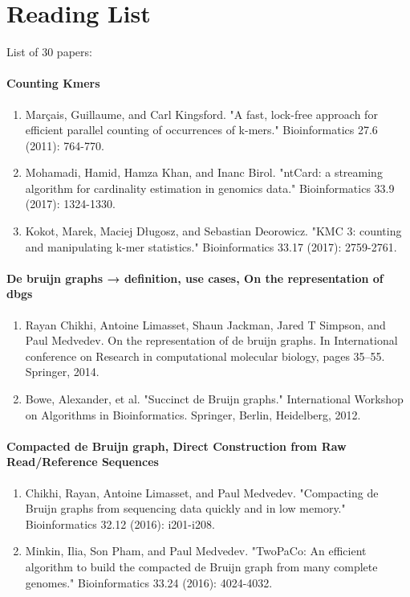 
\chapter{Reading List}
\label{chap:readingList}

List of 30 papers:
\subsubsection{Counting Kmers}
\begin{enumerate}
    \item Marçais, Guillaume, and Carl Kingsford. "A fast, lock-free approach for efficient parallel counting of occurrences of k-mers." Bioinformatics 27.6 (2011): 764-770.
    \item Mohamadi, Hamid, Hamza Khan, and Inanc Birol. "ntCard: a streaming algorithm for cardinality estimation in genomics data." Bioinformatics 33.9 (2017): 1324-1330.
    \item Kokot, Marek, Maciej Długosz, and Sebastian Deorowicz. "KMC 3: counting and manipulating k-mer statistics." Bioinformatics 33.17 (2017): 2759-2761.
\end{enumerate}
\subsubsection{De bruijn graphs → definition, use cases, On the representation of dbgs}
\begin{enumerate}
    \item Rayan Chikhi, Antoine Limasset, Shaun Jackman, Jared T Simpson, and Paul Medvedev. On the representation of de bruijn graphs. In International conference on Research in computational molecular biology, pages 35–55. Springer, 2014.
    \item Bowe, Alexander, et al. "Succinct de Bruijn graphs." International Workshop on Algorithms in Bioinformatics. Springer, Berlin, Heidelberg, 2012.
\end{enumerate}
\subsubsection{Compacted de Bruijn graph, Direct Construction from Raw Read/Reference Sequences}
\begin{enumerate}
    \item Chikhi, Rayan, Antoine Limasset, and Paul Medvedev. "Compacting de Bruijn graphs from sequencing data quickly and in low memory." Bioinformatics 32.12 (2016): i201-i208.
    \item Minkin, Ilia, Son Pham, and Paul Medvedev. "TwoPaCo: An efficient algorithm to build the compacted de Bruijn graph from many complete genomes." Bioinformatics 33.24 (2016): 4024-4032.
\end{enumerate}
